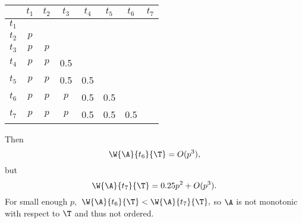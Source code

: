 {{        \begin{center}
            \begin{tabular}{c | c c c c c c c}
            & $t_1$ & $t_2$ & $t_3$ & $t_4$ & $t_5$ & $t_6$ & $t_7$\\ 
            \hline
            $t_1$ &  &  &  & & & & \\
            $t_2$ & $p$ &  &  &  & & & \\
            $t_3$ & $p$ & $p$ &  &  &  & & \\
            $t_4$ & $p$ & $p$ & 0.5 &  &  & & \\
            $t_5$ & $p$ & $p$ & 0.5 & 0.5 &  & & \\
            $t_6$ & $p$ & $p$ & $p$ & 0.5 & 0.5  & & \\
            $t_7$ & $p$ & $p$ & $p$ & 0.5 & 0.5 & 0.5 & \\
            \end{tabular}
        \end{center}

        Then $$\W{\A}{t_6}{\T} = O(p^3),$$ but
    $$\W{\A}{t_7}{\T} = 0.25p^2 + O(p^3).$$ For small enough $p,$ $\W{\A}{t_6}{\T} < \W{\A}{t_7}{\T},$ so $\A$ is not monotonic with respect to $\T$ and thus not ordered.
    }{}

    }
